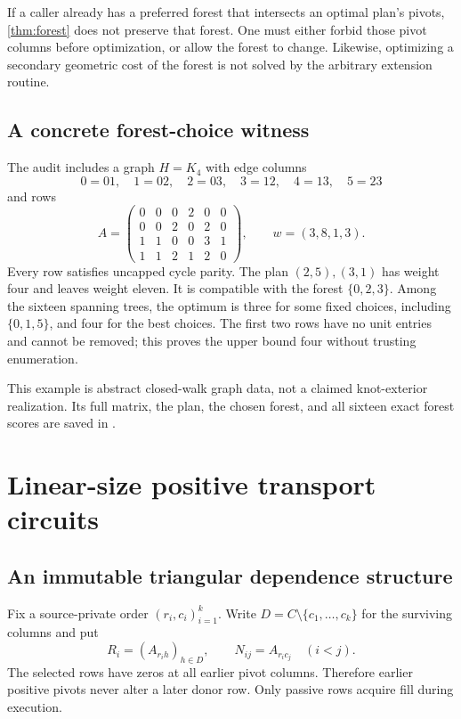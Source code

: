 \documentclass[11pt,letterpaper]{article}
\theoremstyle{definition}
\theoremstyle{remark}
\begin{document}
If a caller already has a preferred forest that intersects an optimal plan's pivots, \cref{thm:forest} does not preserve that forest. One must either forbid those pivot columns before optimization, or allow the forest to change. Likewise, optimizing a secondary geometric cost of the forest is not solved by the arbitrary extension routine.

\subsection{A concrete forest-choice witness}
The audit includes a graph $H=K_4$ with edge columns
\[
 0=01,\quad1=02,\quad2=03,\quad3=12,\quad4=13,\quad5=23
\]
and rows
\[
 A=\begin{pmatrix}
 0&0&0&2&0&0\\
 0&0&2&0&2&0\\
 1&1&0&0&3&1\\
 1&1&2&1&2&0
 \end{pmatrix},\qquad w=(3,8,1,3).
\]
Every row satisfies uncapped cycle parity. The plan $(2,5),(3,1)$ has weight four and leaves weight eleven. It is compatible with the forest $\{0,2,3\}$. Among the sixteen spanning trees, the optimum is three for some fixed choices, including $\{0,1,5\}$, and four for the best choices. The first two rows have no unit entries and cannot be removed; this proves the upper bound four without trusting enumeration.

This example is abstract closed-walk graph data, not a claimed knot-exterior realization. Its full matrix, the plan, the chosen forest, and all sixteen exact forest scores are saved in .

\section{Linear-size positive transport circuits}
\label{sec:transport}

\subsection{An immutable triangular dependence structure}
Fix a source-private order $(r_i,c_i)_{i=1}^k$. Write $D=C\setminus\{c_1,\ldots,c_k\}$ for the surviving columns and put
\[
 R_i=(A_{r_i h})_{h\in D},\qquad N_{ij}=A_{r_i c_j}\quad(i<j).
\]
The selected rows have zeros at all earlier pivot columns. Therefore earlier positive pivots never alter a later donor row. Only passive rows acquire fill during execution.
\end{document}
